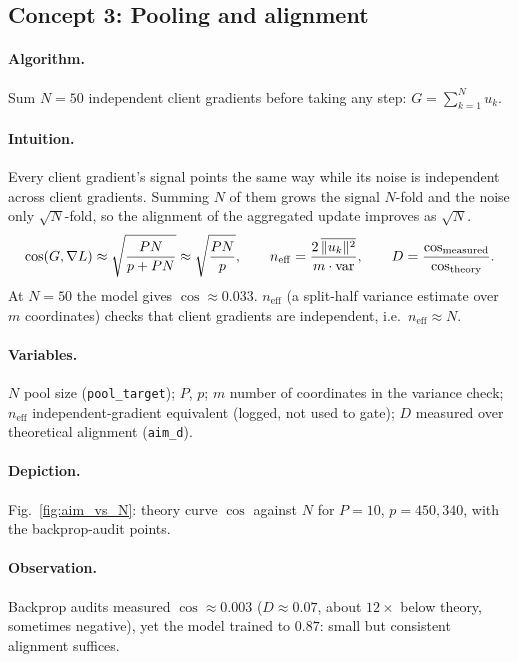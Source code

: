 \subsection{Concept 3: Pooling and alignment}
\paragraph{Algorithm.}
Sum $N{=}50$ independent client gradients before taking any step: $G=\sum_{k=1}^{N}u_k$.
\paragraph{Intuition.}
Every client gradient's signal points the same way while its noise is independent across client gradients. Summing $N$ of them grows
the signal $N$-fold and the noise only $\sqrt N$-fold, so the alignment of the aggregated update improves as $\sqrt N$.
\begin{equation}
\cos(G,\nabla L)\approx\sqrt{\frac{PN}{p+PN}}\approx\sqrt{\frac{PN}{p}},\qquad
n_{\mathrm{eff}}=\frac{2\,\overline{\lVert u_k\rVert^2}}{m\cdot\mathrm{var}},\qquad
D=\frac{\cos_{\mathrm{measured}}}{\cos_{\mathrm{theory}}}.
\end{equation}
At $N=50$ the model gives $\cos\approx0.033$. $n_{\mathrm{eff}}$ (a split-half variance estimate over $m$ coordinates) checks that client gradients are independent, i.e.\ $n_{\mathrm{eff}}\approx N$.
\paragraph{Variables.}
$N$ pool size (\texttt{pool\_target}); $P$, $p$; $m$ number of coordinates in the variance check; $n_{\mathrm{eff}}$ independent-gradient equivalent (logged, not used to gate); $D$ measured over theoretical alignment (\texttt{aim\_d}).
\paragraph{Depiction.} Fig.~\ref{fig:aim_vs_N}: theory curve $\cos$ against $N$ for $P=10$, $p=450{,}340$, with the backprop-audit points.
\paragraph{Observation.}
Backprop audits measured $\cos\approx0.003$ ($D\approx0.07$, about $12\times$ below theory, sometimes negative), yet the model trained to $0.87$: small but consistent alignment suffices.

